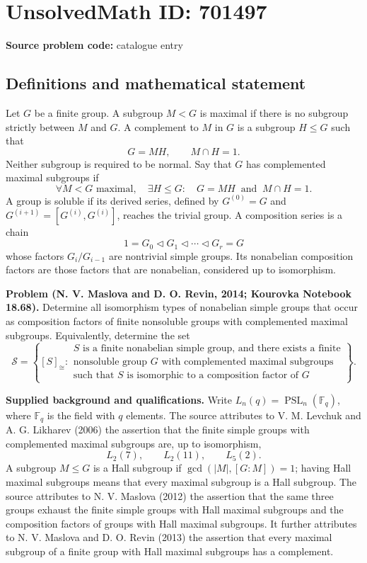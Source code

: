 \documentclass[11pt]{article}
\newcommand{\F}{\mathbb{F}}
\begin{document}
\section*{UnsolvedMath ID: 701497}
\textbf{Source problem code:} catalogue entry
\subsection{Definitions and mathematical statement}
Let \(G\) be a finite group. A subgroup \(M<G\) is maximal if there is no subgroup strictly between \(M\) and \(G\). A complement to \(M\) in \(G\) is a subgroup \(H\leq G\) such that
\[
G=MH,\qquad M\cap H=1.
\]
Neither subgroup is required to be normal. Say that \(G\) has complemented maximal subgroups if
\[
\forall M<G\text{ maximal},\quad \exists H\leq G:\quad G=MH\ \text{ and }\ M\cap H=1.
\]
A group is soluble if its derived series, defined by \(G^{(0)}=G\) and \(G^{(i+1)}=[G^{(i)},G^{(i)}]\), reaches the trivial group. A composition series is a chain
\[
1=G_0\triangleleft G_1\triangleleft\cdots\triangleleft G_r=G
\]
whose factors \(G_i/G_{i-1}\) are nontrivial simple groups. Its nonabelian composition factors are those factors that are nonabelian, considered up to isomorphism.

\textbf{Problem (N. V. Maslova and D. O. Revin, 2014; Kourovka Notebook 18.68).} Determine all isomorphism types of nonabelian simple groups that occur as composition factors of finite nonsoluble groups with complemented maximal subgroups. Equivalently, determine the set
\[
\mathcal S=\left\{[S]_{\cong}:\begin{array}{l}
S\text{ is a finite nonabelian simple group, and there exists a finite}\\
\text{nonsoluble group }G\text{ with complemented maximal subgroups}\\
\text{such that }S\text{ is isomorphic to a composition factor of }G
\end{array}\right\}.
\]

\textbf{Supplied background and qualifications.} Write \(L_n(q)=\operatorname{PSL}_n(\F_q)\), where \(\F_q\) is the field with \(q\) elements. The source attributes to V. M. Levchuk and A. G. Likharev (2006) the assertion that the finite simple groups with complemented maximal subgroups are, up to isomorphism,
\[
L_2(7),\qquad L_2(11),\qquad L_5(2).
\]
A subgroup \(M\leq G\) is a Hall subgroup if \(\gcd(|M|,[G:M])=1\); having Hall maximal subgroups means that every maximal subgroup is a Hall subgroup. The source attributes to N. V. Maslova (2012) the assertion that the same three groups exhaust the finite simple groups with Hall maximal subgroups and the composition factors of groups with Hall maximal subgroups. It further attributes to N. V. Maslova and D. O. Revin (2013) the assertion that every maximal subgroup of a finite group with Hall maximal subgroups has a complement.
\end{document}

